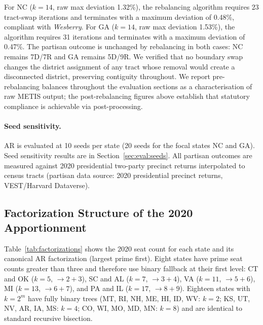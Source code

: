 For NC ($k=14$, raw max deviation 1.32\%), the rebalancing algorithm requires
23 tract-swap iterations and terminates with a maximum deviation of 0.48\%,
compliant with \emph{Wesberry}.
For GA ($k=14$, raw max deviation 1.53\%), the algorithm requires 31 iterations
and terminates with a maximum deviation of 0.47\%.
The partisan outcome is unchanged by rebalancing in both cases: NC remains 7D/7R
and GA remains 5D/9R.
We verified that no boundary swap changes the district assignment of any tract
whose removal would create a disconnected district, preserving contiguity
throughout.
We report pre-rebalancing balances throughout the evaluation sections as a
characterisation of raw METIS output; the post-rebalancing figures above
establish that statutory compliance is achievable via post-processing.

\paragraph{Seed sensitivity.}
AR is evaluated at 10 seeds per state (20 seeds for the focal states NC and
GA). Seed sensitivity results are in Section~\ref{sec:eval:seeds}. All partisan
outcomes are measured against 2020 presidential two-party precinct returns
interpolated to census tracts \citep{deford2019recombination} (partisan data source: 2020 presidential precinct returns, VEST/Harvard Dataverse).

\subsection{Factorization Structure of the 2020 Apportionment}
\label{sec:eval:factorizations}

Table~\ref{tab:factorizations} shows the 2020 seat count for each state and its
canonical AR factorization (largest prime first). Eight states have prime seat
counts greater than three and therefore use binary fallback at their first
level: CT and OK ($k=5$, $\to 2+3$),
SC and AL ($k=7$, $\to 3+4$), VA ($k=11$, $\to 5+6$), MI ($k=13$, $\to 6+7$),
and PA and IL ($k=17$, $\to 8+9$). Eighteen states with $k = 2^m$ have fully binary
trees (MT, RI, NH, ME, HI, ID, WV: $k=2$; KS, UT, NV, AR, IA, MS: $k=4$;
CO, WI, MO, MD, MN: $k=8$) and are identical to standard recursive bisection.

